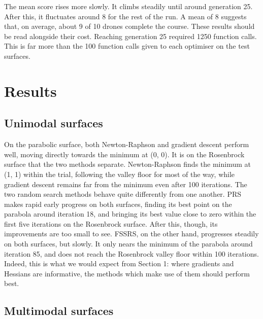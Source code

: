 \documentclass[
  a4paper,
  DIV=11,
  numbers=noendperiod]{scrartcl}
\newcommand{\+}{\phantom{-}}
\begin{document}
The mean score rises more slowly. It climbs steadily until around
generation 25. After this, it fluctuates around 8 for the rest of the
run. A mean of 8 suggests that, on average, about 9 of 10 drones
complete the course. These results should be read alongside their cost.
Reaching generation 25 required 1250 function calls. This is far more
than the 100 function calls given to each optimiser on the test
surfaces.

\section{Results}\label{results}

\subsection{Unimodal surfaces}\label{unimodal-surfaces}

On the parabolic surface, both Newton-Raphson and gradient descent
perform well, moving directly towards the minimum at (0, 0). It is on
the Rosenbrock surface that the two methods separate. Newton-Raphson
finds the minimum at (1, 1) within the trial, following the valley floor
for most of the way, while gradient descent remains far from the minimum
even after 100 iterations. The two random search methods behave quite
differently from one another. PRS makes rapid early progress on both
surfaces, finding its best point on the parabola around iteration 18,
and bringing its best value close to zero within the first five
iterations on the Rosenbrock surface. After this, though, its
improvements are too small to see. FSSRS, on the other hand, progresses
steadily on both surfaces, but slowly. It only nears the minimum of the
parabola around iteration 85, and does not reach the Rosenbrock valley
floor within 100 iterations. Indeed, this is what we would expect from
Section 1: where gradients and Hessians are informative, the methods
which make use of them should perform best.

\subsection{Multimodal surfaces}\label{multimodal-surfaces}
\end{document}
